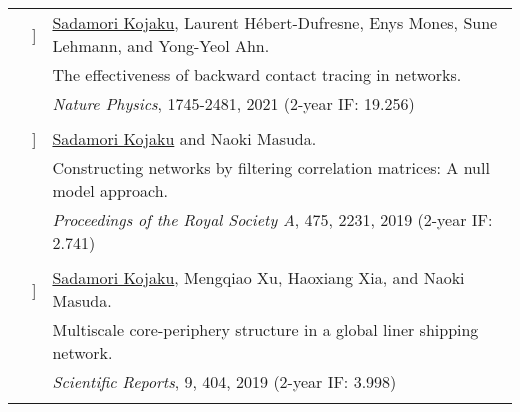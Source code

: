 \documentclass[letterpaper, 11pt]{article}
\newcounter{papercount}
\newcounter{papertype}
\newcommand{\paperitem}{%
\stepcounter{papercount}%
{\color{OliveGreen}{[\Alph{papertype}\thepapercount}]}
}
\begin{document}
\begin{longtable}{p{1.3in}p{2em}p{5.5in}}
                                                    &\paperitem & \underline{Sadamori Kojaku}, Laurent H\'ebert-Dufresne, Enys Mones, Sune Lehmann, and Yong-Yeol Ahn. \\
                                                    & & The effectiveness of backward contact tracing in networks. \\
                                                    & & \textit{Nature Physics}, 1745-2481, 2021 (2-year IF: 19.256)\\
                                                    &
                                                                                                                                                                                                                                                                              \\
                                                    &\paperitem & \underline{Sadamori Kojaku} and Naoki Masuda. \\
                                                    & &  Constructing networks by filtering correlation matrices: A null model approach. \\
                                                    & & \textit{Proceedings of the Royal Society A}, 475, 2231, 2019 (2-year IF: 2.741)\\
                                                    &
                                                                                                                                                                                                                                                                              \\
                                                    &\paperitem & \underline{Sadamori Kojaku}, Mengqiao Xu, Haoxiang Xia, and Naoki Masuda. \\
                                                    & &Multiscale core-periphery structure in a global liner shipping network. \\
                                                    & &\textit{Scientific Reports}, 9, 404, 2019  (2-year IF: 3.998)\\
                                                    &
                                                                                                                                                                                                                                                                              \\

\end{longtable}
\end{document}
